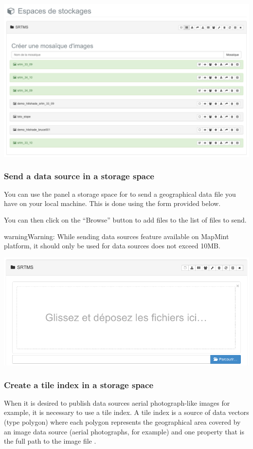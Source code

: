 \documentclass[letterpaper,10pt,english]{sphinxmanual}
\begin{document}
\includegraphics[width=1.000\linewidth]{data-store-mozaic.png}


\subsubsection{Send a data source in a storage space}
\label{data/datastores:envoyer-une-source-de-donnees-dans-un-espace-de-stockage}
You can use the panel a storage space for to send a geographical data file you have on your local machine. This is done using the form provided below.

You can then click on the ``Browse'' button to add files to the list of files to send.

\begin{notice}{warning}{Warning:}
While sending data sources feature available on MapMint platform, it should only be used for data sources does not exceed 10MB.
\end{notice}

\includegraphics[width=1.000\linewidth]{data-store-upload.png}


\subsubsection{Create a tile index in a storage space}
\label{data/datastores:creer-un-index-de-tuiles-dans-un-espace-de-stockage}
When it is desired to publish data sources aerial photograph-like images for example, it is necessary to use a tile index. A tile index is a source of data vectors (type polygon) where each polygon represents the geographical area covered by an image data source (aerial photographs, for example) and one property that is the full path to the image file .
\end{document}
